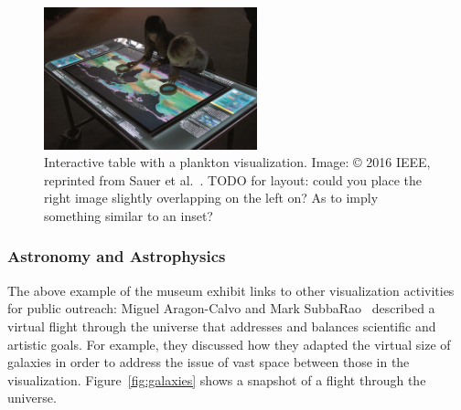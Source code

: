\documentclass[10pt,journal,compsoc]{IEEEtran}
\begin{document}
\begin{figure}
    \begin{center}    
        \includegraphics[width=0.55\textwidth]{museum1.png} \hspace{-3em} 
        \caption{Interactive table with a plankton visualization. Image: \copyright{} 2016 IEEE, reprinted from Sauer et al.~\cite{Sauer2016}. TODO for layout: could you place the right image slightly overlapping on the left on? As to imply something similar to an inset?
  \label{fig:museum}}        
    \end{center}
\end{figure}



\subsubsection{Astronomy and Astrophysics}


The above example of the museum exhibit links to other visualization activities for public outreach: 
Miguel Aragon-Calvo and Mark SubbaRao~\cite{Aragon-Calvo2015} described a virtual flight through the universe that addresses and balances scientific and artistic goals. For example, they discussed how they adapted the virtual size of galaxies in order to address the issue of vast space between those in the visualization. Figure~\ref{fig:galaxies} shows a snapshot of a flight through the universe.
\end{document}
